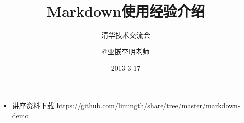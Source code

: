 \documentclass[10pt]{beamer}
\title{Markdown使用经验介绍}
\subtitle{清华技术交流会}
\author{@亚嵌李明老师}
\date{2013-3-17}
\institute{http://weibo.com/limingth}
\begin{document}
\begin{frame}
\titlepage
\begin{itemize}
\item 	讲座资料下载 \url{https://github.com/limingth/share/tree/master/markdown-demo}
\end{itemize}
\end{frame}


\end{document}
